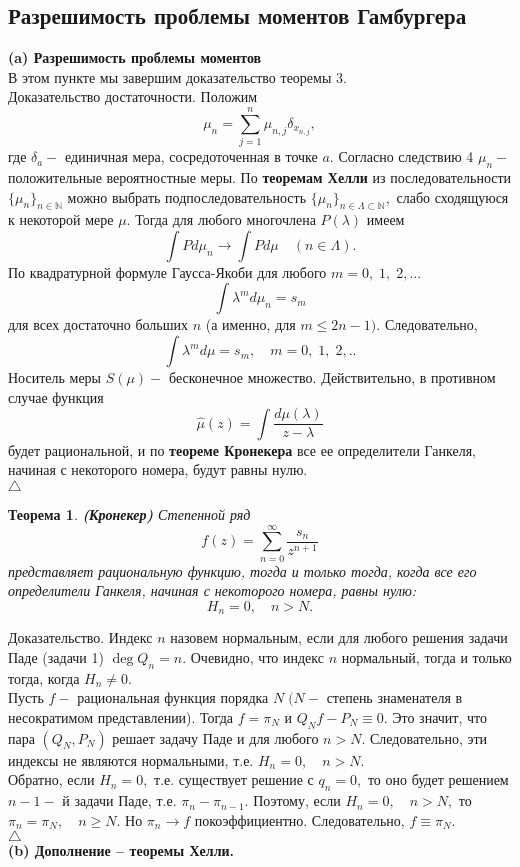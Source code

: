 \documentclass[12pt,a4paper]{article}
\theoremstyle{plain}   \newtheorem{Pro}{Задача}
\newtheorem{The}{Теорема}
\begin{document}
\subsection{Разрешимость проблемы моментов Гамбургера}
$ \; $
\\
{\bfseries (a) Разрешимость проблемы моментов}\\
В этом пункте мы завершим доказательство теоремы 3.\\
{\Large Доказательство достаточности.}
Положим
$$
  \mu _n =\sum _{j=1}^n \mu _{n,j} \delta _{x_{n,j}},
$$
где
$ \delta _a - $
единичная мера, сосредоточенная в точке
$ a . $
Согласно следствию 4
$ \mu _n - $
положительные вероятностные меры. По
{\bfseries теоремам Хелли}
из последовательности
$ \{ \mu _n \} _{n \in \mathbb{N}} $
можно выбрать подпоследовательность
$ \{ \mu _n \} _{n \in \Lambda \subset \mathbb{N}}, $
слабо сходящуюся к некоторой мере
$ \mu . $
Тогда для любого многочлена
$ P(\lambda ) $
имеем
$$
  \int P d \mu _n \rightarrow \int P d \mu
  \quad (n \in \Lambda ).
$$
По квадратурной формуле Гаусса-Якоби для любого
$ m=0, \; 1, \; 2,... $
$$
  \int \lambda ^m d \mu _n =s_m
$$
для всех достаточно больших
$ n $
(а именно, для
$ m \leq 2n-1 ). $
Следовательно,
$$
  \int \lambda ^m d \mu =s_m ,
  \quad m=0, \; 1, \; 2,..
$$
Носитель меры
$ S( \mu ) - $
бесконечное множество. Действительно, в противном случае функция
$$
  \hat \mu (z)=\int \frac{d \mu (\lambda )}{z-\lambda }
$$
будет рациональной, и по
{\bfseries теореме Кронекера}
все ее определители
Ганкеля, начиная с некоторого номера, будут равны нулю.\\
$ \triangle $
\begin{The}{\bfseries (Кронекер)}
Степенной ряд
$$
  f(z)= \sum _{n=0}^{\infty}
  \frac{s_n}{z^{n+1}}
$$
представляет рациональную функцию, тогда и только тогда,
когда все его определители Ганкеля, начиная с некоторого номера,
равны нулю:
$$
  H_n =0, \quad n>N.
$$
\end{The}
{\Large Доказательство.}
Индекс
$ n $
назовем нормальным, если для любого решения задачи Паде
(задачи 1)
$ \deg Q_n =n . $
Очевидно, что индекс
$ n $
нормальный, тогда и только тогда, когда
$ H_n \not =0. $
\\
Пусть
$ f - $
рациональная функция порядка
$ N \; ( N - $
степень знаменателя в несократимом представлении). Тогда
$ f=\pi _N $
и
$ Q_N f -P_N \equiv 0. $
Это значит, что пара
$ (Q_N , P_N ) $
решает задачу Паде и для любого
$ n>N . $
Следовательно, эти индексы не являются нормальными, т.е.
$ H_n =0, \quad n>N. $
\\
Обратно, если
$ H_n =0 , $
т.е. существует решение с
$ q_n =0 , $
то оно будет решением
$ n-1 - $
й задачи Паде, т.е.
$ \pi _n -\pi _{n-1} . $
Поэтому, если
$ H_n =0, \quad n>N, $
то
$ \pi _n =\pi _N , \quad n \geq N. $
Но
$ \pi _n \rightarrow f $
покоэффициентно. Следовательно,
$ f \equiv \pi _N . $
\\
$ \triangle $
\\
{\bfseries (b)    Дополнение -- теоремы Хелли.}
\\
\end{document}
